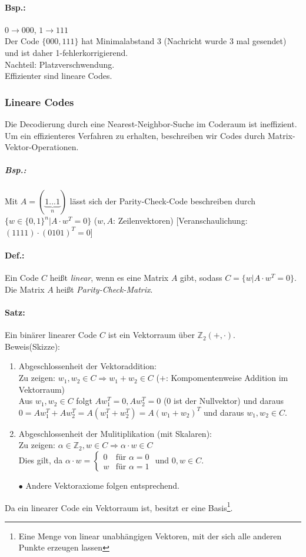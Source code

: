 \paragraph{Bsp.:} $0 \rightarrow 000$, $1\rightarrow 111$\\
Der Code $\{000,111\}$ hat Minimalabstand 3 (Nachricht wurde 3 mal gesendet) und ist daher 1-fehlerkorrigierend.\\
Nachteil: Platzverschwendung.\medskip\\
Effizienter sind lineare Codes.
\subsubsection{Lineare Codes}
Die Decodierung durch eine Nearest-Neighbor-Suche im Coderaum ist ineffizient. Um ein effizienteres Verfahren zu erhalten, beschreiben wir Codes durch Matrix-Vektor-Operationen.
\subparagraph{Bsp.:} Mit $A = (\underbrace{1 ... 1}_{n})$ lässt sich der Parity-Check-Code beschreiben durch $\{w\in \{0,1\}^n| A\cdot w^T=0\}$ ($w,A$: Zeilenvektoren) [Veranschaulichung: $(1111)\cdot(0101)^T=0$]

\paragraph{Def.:} Ein Code $C$ heißt \emph{linear}, wenn es eine Matrix $A$ gibt, sodass $C=\{w|A\cdot w^T=0\}$.\\
Die Matrix $A$ heißt \emph{Parity-Check-Matrix}.

\paragraph{Satz:} Ein binärer linearer Code $C$ ist ein Vektorraum über $\mathbb{Z}_2(+,\cdot)$.\\
Beweis(Skizze):
\begin{enumerate}
\item Abgeschlossenheit der Vektoraddition:\\
Zu zeigen: $w_1,w_2\in C \Rightarrow w_1+w_2 \in C$ ($+$: Kompomentenweise Addition im Vektorraum)\\
Aus $w_1,w_2\in C$ folgt $Aw_1^T=0, Aw_2^T=0$ ($0$ ist der Nullvektor) und daraus $0=Aw_1^T+Aw_2^T=A(w_1^T+w_2^T)=A(w_1+w_2)^T$ und daraus $w_1,w_2 \in C$.
\item Abgeschlossenheit der Mulitiplikation (mit Skalaren):\\
Zu zeigen: $\alpha \in \mathbb{Z}_2, w \in C \Rightarrow \alpha \cdot w \in C$\\
Dies gilt, da $\alpha\cdot w =\begin{cases}
0 & \text{für }\alpha =0\\
w & \text{für } \alpha =1
\end{cases}$ und $0,w \in C$.
\item[$\bullet$] Andere Vektoraxiome folgen entsprechend.
\end{enumerate}
Da ein linearer Code ein Vektorraum ist, besitzt er eine Basis\footnote{Eine Menge von linear unabhängigen Vektoren, mit der sich alle anderen Punkte erzeugen lassen}.


